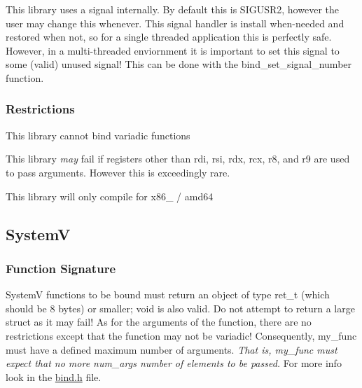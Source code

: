 \begin{DoxyEnumerate}
\item This library uses a signal internally. By default this is {\ttfamily S\+I\+G\+U\+S\+R2}, however the user may change this whenever. This signal handler is install when-\/needed and restored when not, so for a single threaded application this is perfectly safe. However, in a multi-\/threaded enviornment it is important to set this signal to some (valid) unused signal! This can be done with the {\ttfamily bind\+\_\+set\+\_\+signal\+\_\+number} function.
\end{DoxyEnumerate}

\subsubsection*{Restrictions}


\begin{DoxyEnumerate}
\item This library cannot bind variadic functions
\end{DoxyEnumerate}
\begin{DoxyEnumerate}
\item This library {\itshape may} fail if registers other than {\ttfamily rdi}, {\ttfamily rsi,} {\ttfamily rdx}, {\ttfamily rcx}, {\ttfamily r8}, and {\ttfamily r9} are used to pass arguments. However this is exceedingly rare.
\end{DoxyEnumerate}
\begin{DoxyEnumerate}
\item This library will only compile for {\ttfamily x86\+\_} / {\ttfamily amd64}
\end{DoxyEnumerate}

\subsection*{SystemV}

\subsubsection*{Function Signature}

SystemV functions to be bound must return an object of type {\ttfamily ret\+\_\+t} (which should be 8 bytes) or smaller; {\ttfamily void} is also valid. Do not attempt to return a large struct as it may fail! As for the arguments of the function, there are no restrictions except that the function may not be variadic! Consequently, {\ttfamily my\+\_\+func} must have a defined maximum number of \textquotesingle{}arguments\textquotesingle{}. {\itshape That is, {\ttfamily my\+\_\+func} must expect that no more {\ttfamily num\+\_\+args} number of elements to be passed.} For more info look in the {\ttfamily \hyperlink{bind_8h}{bind.\+h}} file.

